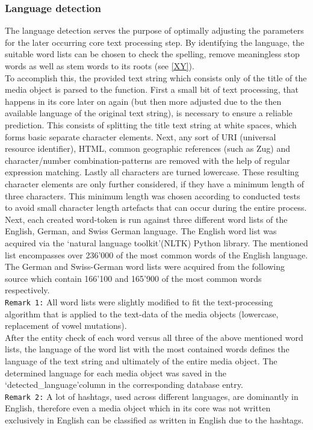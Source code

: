 \subsubsection{Language detection} \label{langauge_detection}
The language detection serves the purpose of optimally adjusting the parameters for the later occurring core text processing step. By identifying the language, the suitable word lists can be chosen to check the spelling, remove meaningless stop words as well as stem words to its roots (see \ref{XY}).\\
\newline
To accomplish this, the provided text string which consists only of the title of the media object is parsed to the function. First a small bit of text processing, that happens in its core later on again (but then more adjusted due to the then available language of the original text string), is necessary to ensure a reliable prediction. This consists of splitting the title text string at white spaces, which forms basic separate character elements. Next, any sort of URI (universal resource identifier), HTML, common geographic references (such as Zug) and character/number combination-patterns are removed with the help of regular expression matching. Lastly all characters are turned lowercase. These resulting character elements are only further considered, if they have a minimum length of three characters. This minimum length was chosen according to conducted tests to avoid small character length artefacts that can occur during the entire process.\\
Next, each created word-token is run against three different word lists of the English, German, and Swiss German language.
The English word list was acquired via the \lq natural language toolkit\rq (NLTK) Python library. The mentioned list encompasses over 236\rq000 of the most common words of the English language.
The German and Swiss-German word lists were acquired from the following source \cite{GeooffwicksWordLanguages} which contain 166\rq100 and 165\rq900  of the most common words respectively.\\
\newline
\texttt{Remark 1:} All word lists were slightly modified to fit the text-processing algorithm that is applied to the text-data of the media objects (lowercase, replacement of vowel mutations).\\
\newline
After the entity check of each word versus all three of the above mentioned word lists, the language of the word list with the most contained words defines the language of the text string and ultimately of the entire media object. The determined language for each media object was saved in the \lq detected\_language\rq column in the corresponding database entry.\\
\newline
\texttt{Remark 2:} A lot of hashtags, used across different languages, are dominantly in English, therefore even a media object which in its core was not written exclusively in English can be classified as written in English due to the hashtags.

